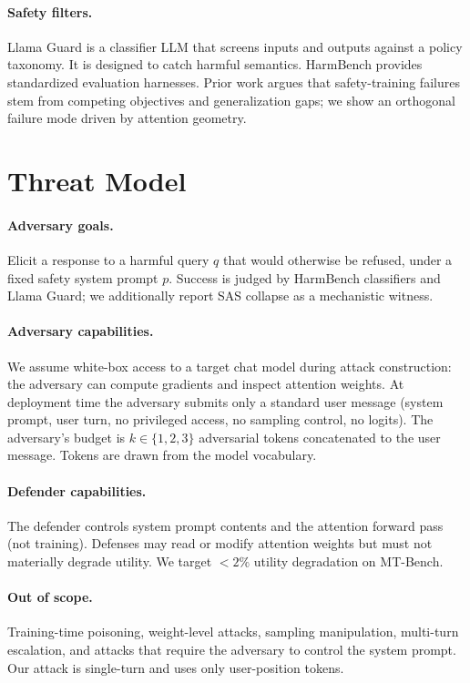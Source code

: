 \documentclass{article}
\theoremstyle{definition}
\theoremstyle{remark}
\begin{document}
\paragraph{Safety filters.} Llama Guard \cite{inan2023llamaguard} is a classifier LLM that screens inputs and outputs against a policy taxonomy. It is designed to catch harmful semantics. HarmBench \cite{mazeika2024harmbench} provides standardized evaluation harnesses. Prior work \cite{wei2023jailbroken} argues that safety-training failures stem from competing objectives and generalization gaps; we show an orthogonal failure mode driven by attention geometry.

\section{Threat Model}
\label{sec:threat}

\paragraph{Adversary goals.} Elicit a response to a harmful query $q$ that would otherwise be refused, under a fixed safety system prompt $p$. Success is judged by HarmBench classifiers and Llama Guard; we additionally report SAS collapse as a mechanistic witness.

\paragraph{Adversary capabilities.} We assume white-box access to a target chat model during attack construction: the adversary can compute gradients and inspect attention weights. At deployment time the adversary submits only a standard user message (system prompt, user turn, no privileged access, no sampling control, no logits). The adversary's budget is $k \in \{1,2,3\}$ adversarial tokens concatenated to the user message. Tokens are drawn from the model vocabulary.

\paragraph{Defender capabilities.} The defender controls system prompt contents and the attention forward pass (not training). Defenses may read or modify attention weights but must not materially degrade utility. We target $<2\%$ utility degradation on MT-Bench.

\paragraph{Out of scope.} Training-time poisoning, weight-level attacks, sampling manipulation, multi-turn escalation, and attacks that require the adversary to control the system prompt. Our attack is single-turn and uses only user-position tokens.
\end{document}
